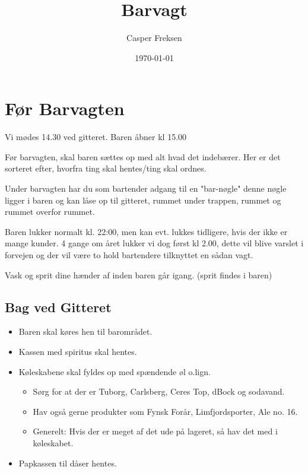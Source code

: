 

\title{Barvagt}
\date{\today}
\author{Casper Freksen}



\maketitle

\tableofcontents

\section{Før Barvagten}
\label{sec:pre-barvagten}

Vi mødes 14.30 ved gitteret. Baren åbner kl 15.00

Før barvagten, skal baren sættes op med alt hvad det indebærer. Her er
det sorteret efter, hvorfra ting skal hentes/ting skal ordnes.

Under barvagten har du som bartender adgang til en "bar-nøgle" denne nøgle ligger i baren og kan låse op til gitteret, rummet under trappen, rummet og rummet overfor rummet.

Baren lukker normalt kl. 22:00, men kan
evt. lukkes tidligere, hvis der ikke er mange kunder. 4 gange om året lukker vi dog først kl 2.00, dette vil blive varslet i forvejen og der vil være to hold bartendere tilknyttet en sådan vagt.

Vask og sprit dine hænder af inden baren går igang. (sprit findes i baren)

\subsection{Bag ved Gitteret}
\label{sec:pre:bag-ved-gitteret}

\begin{itemize}
\item Baren skal køres hen til barområdet.
\item Kassen med spiritus skal hentes.
\item Køleskabene skal fyldes op med spændende øl
  o.lign.
  \begin{itemize}
  \item Sørg for at der er Tuborg, Carlsberg, Ceres Top,
    dBock\texttrademark{} og sodavand.
  \item Hav også gerne produkter som Fynsk Forår, Limfjordsporter, Ale
    no. 16.
  \item Generelt: Hvis der er meget af det ude på lageret, så hav det
    med i køleskabet.
  \end{itemize}
\item Papkassen til dåser hentes.
\end{itemize}

